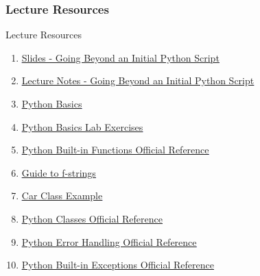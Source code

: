 \documentclass[handout, 11pt]{beamer}
\begin{document}
\appendix
{}
\setcounter{finalframe}{\value{framenumber}}
\begin{frame}
\frametitle{Lecture Resources}
{
\begin{block}{Lecture Resources}
\begin{enumerate}
\item \textcolor{blue}{\underline{\href{https://nickderobertis.github.io/fin-model-course/\_static/generated/pdfs/S4 Going Beyond an Initial Python Script.pdf}{Slides - Going Beyond an Initial Python Script}}}
\item \textcolor{blue}{\underline{\href{https://nickderobertis.github.io/fin-model-course/\_static/generated/pdfs/LN4 Going Beyond an Initial Python Script.pdf}{Lecture Notes - Going Beyond an Initial Python Script}}}
\item \textcolor{blue}{\underline{\href{https://nickderobertis.github.io/fin-model-course/\_static/Examples/Introduction/Python/Python Basics.ipynb}{Python Basics}}}
\item \textcolor{blue}{\underline{\href{https://nickderobertis.github.io/fin-model-course/\_static/Materials for Lab Exercises/Python Basics/Python Basics Lab.ipynb}{Python Basics Lab Exercises}}}
\item \textcolor{blue}{\underline{\href{https://docs.python.org/3/library/functions.html}{Python Built-in Functions Official Reference}}}
\item \textcolor{blue}{\underline{\href{http://cis.bentley.edu/sandbox/wp-content/uploads/Documentation-on-f-strings.pdf}{Guide to f-strings}}}
\item \textcolor{blue}{\underline{\href{https://nickderobertis.github.io/fin-model-course/\_static/Examples/Introduction/Python/car\_example.py}{Car Class Example}}}
\item \textcolor{blue}{\underline{\href{https://docs.python.org/3/reference/datamodel.html}{Python Classes Official Reference}}}
\item \textcolor{blue}{\underline{\href{https://docs.python.org/3/tutorial/errors.html}{Python Error Handling Official Reference}}}
\item \textcolor{blue}{\underline{\href{https://docs.python.org/3/library/exceptions.html}{Python Built-in Exceptions Official Reference}}}
\end{enumerate}
\vfill
\end{block}
}
\label{frames:resources}
\end{frame}
\end{document}
